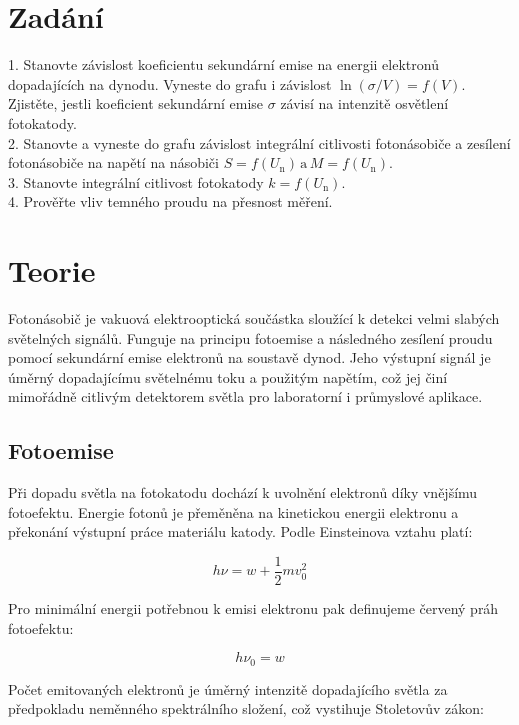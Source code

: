 \documentclass[czech,11pt,a4paper]{article}
\begin{document}
	\begin{multicols}{2}
		\section{Zadání}
		1. Stanovte závislost koeficientu sekundární emise na energii elektronů dopadajících na dynodu. Vyneste do grafu i závislost $\ln (\sigma/V) = f(V)$. Zjistěte, jestli koeficient sekundární emise $\sigma$ závisí na intenzitě osvětlení fotokatody.\\
		2. Stanovte a vyneste do grafu závislost integrální citlivosti fotonásobiče a zesílení fotonásobiče na napětí na násobiči $S = f(U_\text{n})\, \text{a} \,M = f(U_\text{n})$.\\
		3. Stanovte integrální citlivost fotokatody $k = f(U_\text{n})$.\\
		4. Prověřte vliv temného proudu na přesnost měření.
		
		
		
		\section{Teorie}
		
		Fotonásobič je vakuová elektrooptická součástka sloužící k detekci velmi slabých světelných signálů. Funguje na principu fotoemise a následného zesílení proudu pomocí sekundární emise elektronů na soustavě dynod. Jeho výstupní signál je úměrný dopadajícímu světelnému toku a použitým napětím, což jej činí mimořádně citlivým detektorem světla pro laboratorní i průmyslové aplikace.
		
		\subsection{Fotoemise}
		Při dopadu světla na fotokatodu dochází k uvolnění elektronů díky vnějšímu fotoefektu. Energie fotonů je přeměněna na kinetickou energii elektronu a překonání výstupní práce materiálu katody. Podle Einsteinova vztahu platí:
		
		\begin{equation} h\nu = w + \frac{1}{2}mv_0^2 \end{equation}
		
		Pro minimální energii potřebnou k emisi elektronu pak definujeme červený práh fotoefektu:
		
		\begin{equation} h\nu_0 = w \end{equation}
		
		Počet emitovaných elektronů je úměrný intenzitě dopadajícího světla za předpokladu neměnného spektrálního složení, což vystihuje Stoletovův zákon:
		

\end{multicols}
\end{document}
